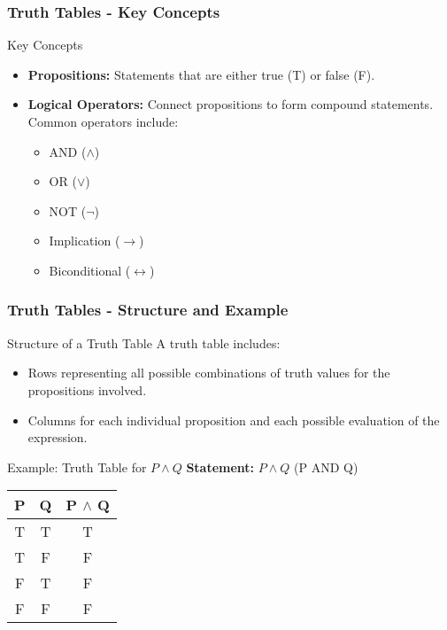 \documentclass[aspectratio=169]{beamer}
\begin{document}
\begin{frame}[fragile]
    \frametitle{Truth Tables - Key Concepts}
    \begin{block}{Key Concepts}
        \begin{itemize}
            \item \textbf{Propositions:} Statements that are either true (T) or false (F).
            \item \textbf{Logical Operators:} Connect propositions to form compound statements. Common operators include:
            \begin{itemize}
                \item AND ($\land$)
                \item OR ($\lor$)
                \item NOT ($\neg$)
                \item Implication ($\to$)
                \item Biconditional ($\leftrightarrow$)
            \end{itemize}
        \end{itemize}
    \end{block}
\end{frame}

\begin{frame}[fragile]
    \frametitle{Truth Tables - Structure and Example}
    \begin{block}{Structure of a Truth Table}
        A truth table includes:
        \begin{itemize}
            \item Rows representing all possible combinations of truth values for the propositions involved.
            \item Columns for each individual proposition and each possible evaluation of the expression.
        \end{itemize}
    \end{block}
    
    \begin{block}{Example: Truth Table for \( P \land Q \)}
        \textbf{Statement:} $P \land Q$ (P AND Q)

        \begin{center}
        \begin{tabular}{|c|c|c|}
            \hline
            P & Q & P $\land$ Q \\
            \hline
            T & T & T \\
            T & F & F \\
            F & T & F \\
            F & F & F \\
            \hline
        \end{tabular}
        \end{center}
    \end{block}
\end{frame}
\end{document}
